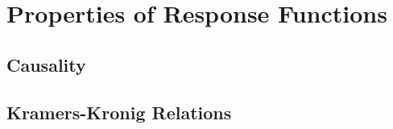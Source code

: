 \section{Properties of Response Functions}
\subsection{Causality}
\subsection{Kramers-Kronig Relations}